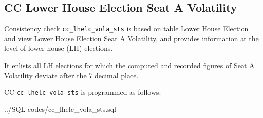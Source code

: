 \subsection{CC Lower House Election Seat A Volatility}\label{cc_lhelc_vola_sts}
Consistency check \texttt{\footnotesize cc\_lhelc\_vola\_sts} is based on table Lower House Election and view Lower House Election Seat A Volatility, and provides information at the level of lower house (LH) elections.

It enlists all LH elections for which the computed and recorded figures of Seat A Volatility deviate after the 7  decimal place.

CC \texttt{\footnotesize cc\_lhelc\_vola\_sts} is programmed as follows:

%
{../SQL-codes/cc_lhelc_vola_sts.sql}
